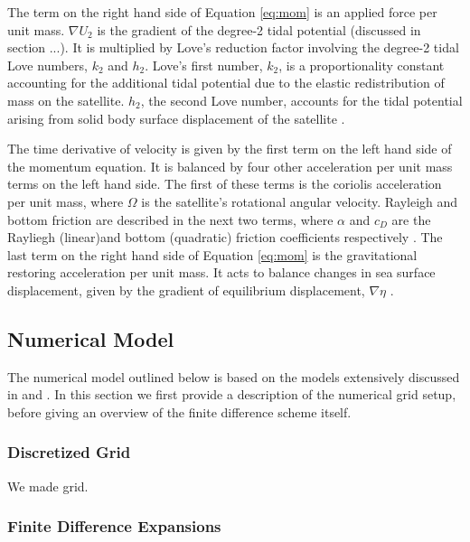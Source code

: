 The term on the right hand side of Equation \ref{eq:mom} is an applied force per unit mass. $\nabla U_2$ is the gradient of the degree-2 tidal potential (discussed in section ...). It is multiplied by Love's reduction factor involving the degree-2 tidal Love numbers, $k_2$ and $h_2$. Love's first number, $k_2$, is a proportionality constant accounting for the additional tidal potential due to the elastic redistribution of mass on the satellite. $h_2$, the second Love number, accounts for the tidal potential arising from solid body surface displacement of the satellite \citep{love1911some}.

The time derivative of velocity is given by the first term on the left hand side of the momentum equation. It is balanced by four other acceleration per unit mass terms on the left hand side. The first of these terms is the coriolis acceleration per unit mass, where $\Omega$ is the satellite's rotational angular velocity. Rayleigh and bottom friction are described in the next two terms, where $\alpha$ and $c_D$ are the Rayliegh (linear)and bottom (quadratic) friction coefficients respectively \citep{sears1995tidal,chen2013tidal}. The last term on the right hand side of Equation \ref{eq:mom} is the gravitational restoring acceleration per unit mass. It acts to balance changes in sea surface displacement, given by the gradient of equilibrium displacement, $\nabla \eta$ .

\subsection{Numerical Model \label{subsec:model}}

The numerical model outlined below is based on the models extensively discussed in \citet{zahel1973diurnalk,zahel1978influence} and \citet{sears1994tidal,sears1995tidal}. In this section we first provide a description of the numerical grid setup, before giving an overview of the finite difference scheme itself.

\subsubsection{Discretized Grid}

We made grid. 

\subsubsection{Finite Difference Expansions}

